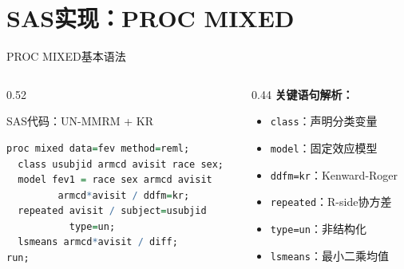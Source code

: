 \documentclass[aspectratio=169,11pt]{beamer}
\begin{document}
\section{SAS实现：PROC MIXED}

\begin{frame}[fragile]{PROC MIXED基本语法}
\begin{columns}[T,totalwidth=\textwidth]
\begin{column}{0.52\textwidth}
\begin{block}{SAS代码：UN-MMRM + KR}
\begin{lstlisting}[language=R,numbers=none,basicstyle=\ttfamily\scriptsize]
proc mixed data=fev method=reml;
  class usubjid armcd avisit race sex;
  model fev1 = race sex armcd avisit 
         armcd*avisit / ddfm=kr;
  repeated avisit / subject=usubjid 
           type=un;
  lsmeans armcd*avisit / diff;
run;
\end{lstlisting}
\end{block}
\end{column}
\begin{column}{0.44\textwidth}
\textbf{关键语句解析：}
\begin{itemize}
    \item \texttt{class}：声明分类变量
    \item \texttt{model}：固定效应模型
    \item \texttt{ddfm=kr}：Kenward-Roger
    \item \texttt{repeated}：R-side协方差
    \item \texttt{type=un}：非结构化
    \item \texttt{lsmeans}：最小二乘均值
\end{itemize}
\end{column}
\end{columns}
\end{frame}
\end{document}
